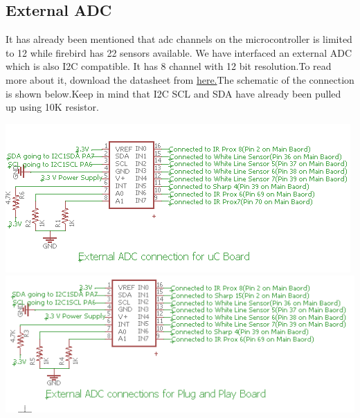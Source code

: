 \documentclass[a4paper,12pt,oneside]{article}
\begin{document}
{	\subsection{\textbf{External ADC}}
	{It has already been mentioned that adc channels on the microcontroller is limited to 12 while firebird has 22 sensors available. We have interfaced an external ADC which is also I2C compatible. It has  8 channel with 12 bit resolution.To read more about it, download the datasheet from \href{www.ti.com/lit/pdf/snas483}{here.}The schematic of the connection is shown below.Keep in mind that I2C SCL and SDA have already been pulled up using 10K resistor.\\}
		\begin{center}
		\includegraphics{Images/externaladcuC}\\
		\includegraphics{Images/externalADCplug}\\
	\end{center}
}
\end{document}
